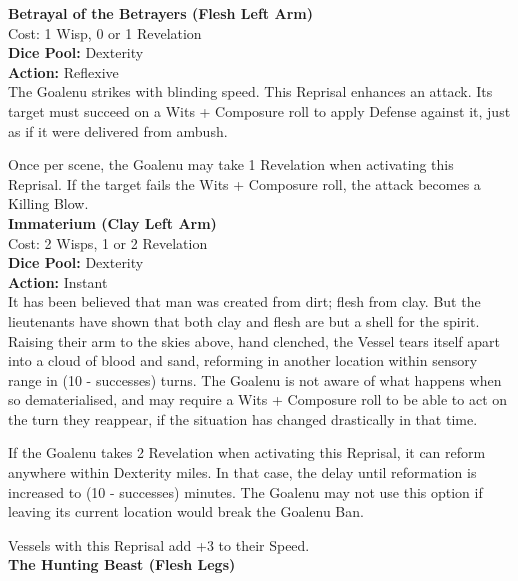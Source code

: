 \noindent\textbf{Betrayal of the Betrayers (Flesh Left Arm)}\\

\noindent Cost: 1 Wisp, 0 or 1 Revelation\\

\noindent\textbf{Dice Pool:} Dexterity\\

\noindent\textbf{Action:} Reflexive\\

\noindent The Goalenu strikes with blinding speed. This Reprisal enhances an attack. Its target must succeed on a Wits + Composure roll to apply Defense against it, just as if it were delivered from ambush.

Once per scene, the Goalenu may take 1 Revelation when activating this Reprisal. If the target fails the Wits + Composure roll, the attack becomes a Killing Blow.\\

\noindent\textbf{Immaterium (Clay Left Arm)}\\

\noindent Cost: 2 Wisps, 1 or 2 Revelation\\

\noindent\textbf{Dice Pool:} Dexterity\\

\noindent\textbf{Action:} Instant\\

\noindent It has been believed that man was created from dirt; flesh from clay. But the lieutenants have shown that both clay and flesh are but a shell for the spirit. Raising their arm to the skies above, hand clenched, the Vessel tears itself apart into a cloud of blood and sand, reforming in another location within sensory range in (10 - successes) turns. The Goalenu is not aware of what happens when so dematerialised, and may require a Wits + Composure roll to be able to act on the turn they reappear, if the situation has changed drastically in that time.

If the Goalenu takes 2 Revelation when activating this Reprisal, it can reform anywhere within Dexterity miles. In that case, the delay until reformation is increased to (10 - successes) minutes. The Goalenu may not use this option if leaving its current location would break the Goalenu Ban.

Vessels with this Reprisal add +3 to their Speed.\\

\noindent\textbf{The Hunting Beast (Flesh Legs)}\\

